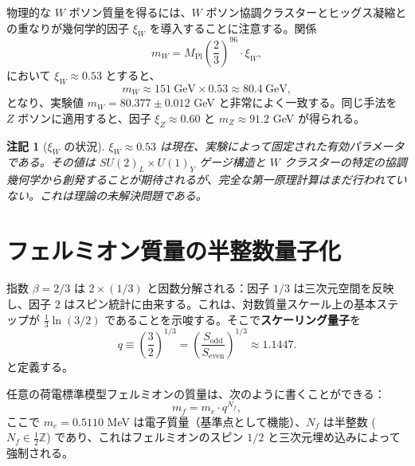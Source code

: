 \documentclass[12pt,a4paper]{article}
\newtheorem{remark}[theorem]{注記}
\begin{document}
	物理的な \(W\) ボソン質量を得るには、\(W\) ボソン協調クラスターとヒッグス凝縮との重なりが幾何学的因子 \(\xi_W\) を導入することに注意する。関係
	\begin{equation}
		m_W = M_{\mathrm{Pl}} \left(\frac{2}{3}\right)^{96} \cdot \xi_W,
		\label{eq:mw}
	\end{equation}
	において \(\xi_W \approx 0.53\) とすると、
	\begin{equation}
		m_W \approx 151\ \mathrm{GeV} \times 0.53 \approx 80.4\ \mathrm{GeV},
	\end{equation}
	となり、実験値 \(m_W = 80.377 \pm 0.012\) GeV と非常によく一致する。同じ手法を \(Z\) ボソンに適用すると、因子 \(\xi_Z \approx 0.60\) と \(m_Z \approx 91.2\) GeV が得られる。
	
	\begin{remark}[\(\xi_W\) の状況]
		\(\xi_W \approx 0.53\) は現在、実験によって固定された有効パラメータである。その値は \(SU(2)_L \times U(1)_Y\) ゲージ構造と \(W\) クラスターの特定の協調幾何学から創発することが期待されるが、完全な第一原理計算はまだ行われていない。これは理論の未解決問題である。
	\end{remark}
	
	\section{フェルミオン質量の半整数量子化}
	
	指数 \(\beta = 2/3\) は \(2 \times (1/3)\) と因数分解される：因子 \(1/3\) は三次元空間を反映し、因子 \(2\) はスピン統計に由来する。これは、対数質量スケール上の基本ステップが \(\frac{1}{3}\ln(3/2)\) であることを示唆する。そこで\textbf{スケーリング量子}を
	\begin{equation}
		q \equiv \left(\frac{3}{2}\right)^{1/3} = \left(\frac{S_{\mathrm{odd}}}{S_{\mathrm{even}}}\right)^{1/3} \approx 1.1447.
	\end{equation}
	と定義する。
	
	任意の荷電標準模型フェルミオンの質量は、次のように書くことができる：
	\begin{equation}
		\boxed{m_f = m_e \cdot q^{N_f}},
		\label{eq:mass-quantization}
	\end{equation}
	ここで \(m_e = 0.5110\) MeV は電子質量（基準点として機能）、\(N_f\) は半整数 (\(N_f \in \frac{1}{2}\mathbb{Z}\)) であり、これはフェルミオンのスピン \(1/2\) と三次元埋め込みによって強制される。
	
\end{document}
